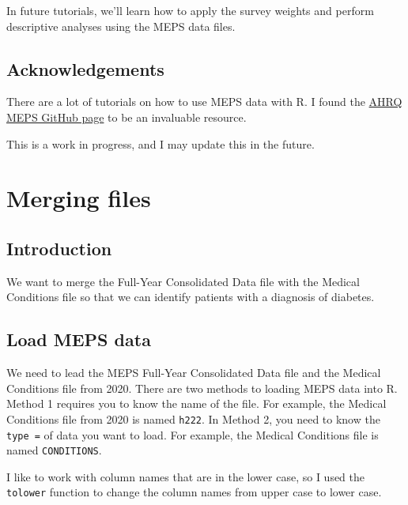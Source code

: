 \documentclass[
]{book}
\theoremstyle{definition}
\theoremstyle{definition}
\theoremstyle{definition}
\theoremstyle{definition}
\theoremstyle{remark}
\begin{document}
In future tutorials, we'll learn how to apply the survey weights and perform descriptive analyses using the MEPS data files.

\hypertarget{acknowledgements}{%
\section{Acknowledgements}\label{acknowledgements}}

There are a lot of tutorials on how to use MEPS data with R. I found the \href{https://github.com/HHS-AHRQ/MEPS}{AHRQ MEPS GitHub page} to be an invaluable resource.

This is a work in progress, and I may update this in the future.

\hypertarget{merging}{%
\chapter{Merging files}\label{merging}}

\hypertarget{introduction-1}{%
\section{Introduction}\label{introduction-1}}

We want to merge the Full-Year Consolidated Data file with the Medical Conditions file so that we can identify patients with a diagnosis of diabetes.

\hypertarget{load-meps-data}{%
\section{Load MEPS data}\label{load-meps-data}}

We need to lead the MEPS Full-Year Consolidated Data file and the Medical Conditions file from 2020. There are two methods to loading MEPS data into R. Method 1 requires you to know the name of the file. For example, the Medical Conditions file from 2020 is named \texttt{h222}. In Method 2, you need to know the \texttt{type\ =} of data you want to load. For example, the Medical Conditions file is named \texttt{CONDITIONS}.

I like to work with column names that are in the lower case, so I used the \texttt{tolower} function to change the column names from upper case to lower case.
\end{document}
